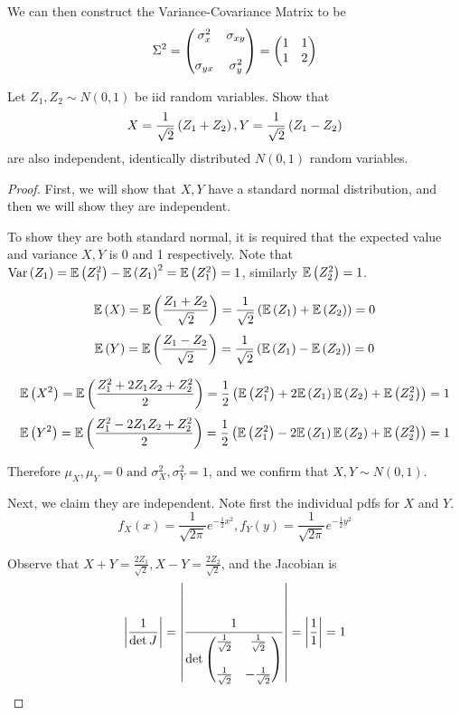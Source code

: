 \documentclass{exam}
\begin{document}
\begin{questions}
\begin{parts}
    We can then construct the Variance-Covariance Matrix to be
    $$\Sigma^2 = \left( \begin{matrix}
        \sigma_x^2 & \sigma_{xy} \\
        \\
        \sigma_{yx} & \sigma_y^2 \\
    \end{matrix} \right) = \left( \begin{matrix}
        1 & 1 \\
        1 & 2 \\
    \end{matrix} \right)$$
\end{parts}

\newpage
\question
Let $Z_1, Z_2\sim N(0, 1)$ be iid random variables. Show that
$$X = \frac{1}{\sqrt{2}}\left( Z_1 + Z_2 \right), Y = \frac{1}{\sqrt{2}}\left( Z_1 - Z_2 \right)$$
are also independent, identically distributed $N(0, 1)$ random variables.
\begin{proof}
    First, we will show that $X, Y$ have a standard normal distribution, and then we will show they are independent.

    To show they are both standard normal, it is required that the expected value and variance $X, Y$ is 0 and 1 respectively. Note that $\text{Var}\left( Z_1 \right) = \mathbb{E}\left( Z_1^2 \right) - \mathbb{E}\left( Z_1 \right)^2 = \mathbb{E}\left( Z_1^2 \right) = 1$, similarly $\mathbb{E}\left( Z_2^2 \right) = 1$.

    $$\mathbb{E}\left( X \right) = \mathbb{E}\left( \frac{Z_1 + Z_2}{\sqrt{2}} \right) = \frac{1}{\sqrt{2}}\left( \mathbb{E}\left( Z_1 \right) + \mathbb{E}\left( Z_2 \right) \right) = 0$$
    $$\mathbb{E}\left( Y \right) = \mathbb{E}\left( \frac{Z_1 - Z_2}{\sqrt{2}} \right) = \frac{1}{\sqrt{2}}\left( \mathbb{E}\left( Z_1 \right) - \mathbb{E}\left( Z_2 \right) \right) = 0$$

    $$\mathbb{E}\left( X^2 \right) = \mathbb{E}\left( \frac{Z_1^2 + 2Z_1Z_2 + Z_2^2}{2} \right) = \frac{1}{2}\left( \mathbb{E}\left( Z_1^2 \right) + 2\mathbb{E}\left( Z_1 \right)\mathbb{E}\left( Z_2 \right) + \mathbb{E}\left( Z_2^2 \right) \right) = 1$$
    $$\mathbb{E}\left( Y^2 \right) = \mathbb{E}\left( \frac{Z_1^2 - 2Z_1Z_2 + Z_2^2}{2} \right) = \frac{1}{2}\left( \mathbb{E}\left( Z_1^2 \right) - 2\mathbb{E}\left( Z_1 \right)\mathbb{E}\left( Z_2 \right) + \mathbb{E}\left( Z_2^2 \right) \right) = 1$$

    Therefore $\mu_X, \mu_Y = 0 \text{ and } \sigma_X^2, \sigma_Y^2 = 1$, and we confirm that $X, Y\sim N(0, 1)$.

    Next, we claim they are independent. Note first the individual pdfs for $X$ and $Y$.
    $$f_X(x) = \frac{1}{\sqrt{2\pi}}e^{-\frac{1}{2}x^2}, f_Y(y) = \frac{1}{\sqrt{2\pi}}e^{-\frac{1}{2}y^2}$$

    Observe that $X + Y = \frac{2Z_1}{\sqrt{2}}, X - Y = \frac{2Z_2}{\sqrt{2}}$, and the Jacobian is
    $$\left| \frac{1}{\det J} \right| = \left| \frac{1}{\det\left( \begin{matrix}
        \frac{1}{\sqrt{2}} & \frac{1}{\sqrt{2}} \\
        \\
        \frac{1}{\sqrt{2}} & -\frac{1}{\sqrt{2}} \\
    \end{matrix} \right)} \right| = \left| \frac{1}{1} \right| = 1$$


\end{proof}
\end{questions}
\end{document}
